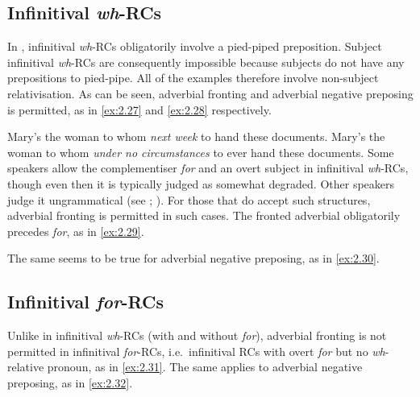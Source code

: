 \documentclass[output=paper]{langsci/langscibook}
\begin{document}
\subsection{Infinitival \emph{wh}-RCs}

In , infinitival \emph{wh}{-\glspl{RC} obligatorily involve a pied-piped
preposition.} Subject infinitival \emph{wh}{-\glspl{RC} are consequently impossible
because subjects do not have any prepositions to pied-pipe. All of the examples
therefore involve non-subject relativisation. As can be seen, adverbial
fronting} and adverbial negative preposing is permitted, as in \eqref{ex:2.27} and \eqref{ex:2.28}
respectively.

\ea\label{ex:2.27}
    Mary’s the woman to whom \textit{next week} to hand these documents.
\ex\label{ex:2.28}
    Mary’s the woman to whom \textit{under no circumstances} to ever hand these documents.
\z
Some speakers allow the complementiser \emph{for} and an overt subject in
infinitival \emph{wh}{-RCs, though even then it is typically judged as somewhat
degraded. Other} speakers judge it ungrammatical (see
\citealt{ChomskyLasnik1977}; \citealt[1067]{Huddleston2002}). For those that do accept such
structures, adverbial fronting is permitted in such cases. The fronted
adverbial obligatorily precedes \emph{for}, as in \eqref{ex:2.29}.

\ea\label{ex:2.29}
    \z
\z
The same seems to be true for adverbial negative preposing, as in \eqref{ex:2.30}.

\ea\label{ex:2.30}
    \z
\z

\subsection{Infinitival \emph{for}-RCs}

Unlike in infinitival \emph{wh}{-\glspl{RC} (with and without} \emph{for}), adverbial
fronting is not permitted in infinitival \emph{for}{-RCs, i.e.\ infinitival RCs
with overt} \emph{for} but no \emph{wh}{-relative pronoun}, as in \eqref{ex:2.31}. The
same applies to adverbial negative preposing, as in \eqref{ex:2.32}.
\end{document}
